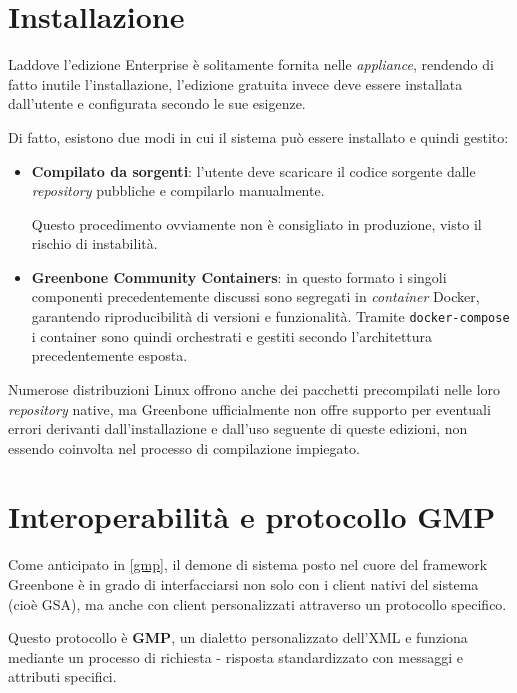 \section{Installazione}
Laddove l'edizione Enterprise è solitamente fornita nelle \emph{appliance}, rendendo di fatto inutile l'installazione, l'edizione gratuita invece deve essere installata dall'utente e configurata secondo le sue esigenze.

Di fatto, esistono due modi in cui il sistema può essere installato e quindi gestito:
\begin{itemize}
    \item \textbf{Compilato da sorgenti}: l'utente deve scaricare il codice sorgente dalle \emph{repository} pubbliche e compilarlo manualmente.
    
    Questo procedimento ovviamente non è consigliato in produzione, visto il rischio di instabilità.
    \item \textbf{Greenbone Community Containers}: in questo formato i singoli componenti precedentemente discussi sono segregati in \emph{container} Docker, garantendo riproducibilità di versioni e funzionalità. Tramite \texttt{docker-compose} i container sono quindi orchestrati e gestiti secondo l'architettura precedentemente esposta.
\end{itemize}

Numerose distribuzioni Linux offrono anche dei pacchetti precompilati nelle loro \emph{repository} native, ma Greenbone ufficialmente non offre supporto per eventuali errori derivanti dall'installazione e dall'uso seguente di queste edizioni, non essendo coinvolta nel processo di compilazione impiegato.

\section{Interoperabilità e protocollo GMP}
Come anticipato in \ref{gmp}, il demone di sistema posto nel cuore del framework Greenbone è in grado di interfacciarsi non solo con i client nativi del sistema (cioè GSA), ma anche con client personalizzati attraverso un protocollo specifico.

Questo protocollo è \textbf{GMP}, un dialetto personalizzato dell'XML e funziona mediante un processo di richiesta - risposta standardizzato con messaggi e attributi specifici.

